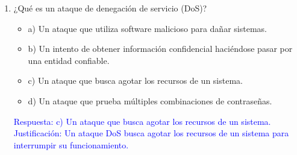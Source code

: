 \documentclass[a4paper]{article}
\begin{document}
\begin{enumerate}
    \item ¿Qué es un ataque de denegación de servicio (DoS)?
    \begin{itemize}
        \item a) Un ataque que utiliza software malicioso para dañar sistemas.
        \item b) Un intento de obtener información confidencial haciéndose pasar por una entidad confiable.
        \item c) Un ataque que busca agotar los recursos de un sistema.
        \item d) Un ataque que prueba múltiples combinaciones de contraseñas.
    \end{itemize}
    \textcolor{blue}{Respuesta: c) Un ataque que busca agotar los recursos de un sistema. Justificación: Un ataque DoS busca agotar los recursos de un sistema para interrumpir su funcionamiento.}
    \vspace{1cm}







\end{enumerate}
\end{document}
